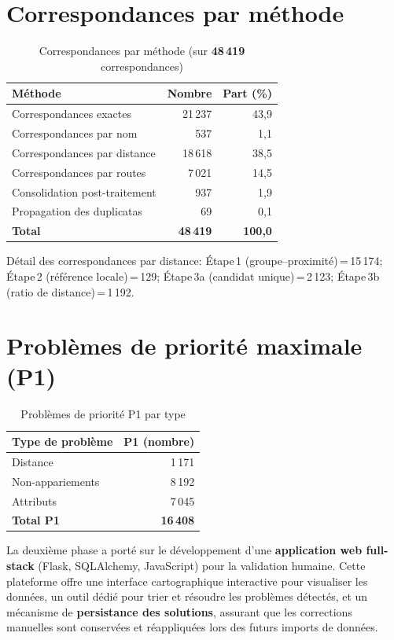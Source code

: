 \section*{Correspondances par méthode}
\begin{table}[h]
\centering
\caption{Correspondances par méthode (sur \textbf{48\,419} correspondances)}
\label{tab:matches_by_method_conclusion}
\begin{tabular}{|l|r|r|}
\hline
\textbf{Méthode} & \textbf{Nombre} & \textbf{Part (\%)} \\
\hline
Correspondances exactes & 21\,237 & 43,9 \\
Correspondances par nom & 537 & 1,1 \\
Correspondances par distance & 18\,618 & 38,5 \\
Correspondances par routes & 7\,021 & 14,5 \\
Consolidation post-traitement & 937 & 1,9 \\
Propagation des duplicatas & 69 & 0,1 \\
\hline
\textbf{Total} & \textbf{48\,419} & \textbf{100,0} \\
\hline
\end{tabular}
\end{table}

\noindent\small Détail des correspondances par distance: Étape\,1 (groupe–proximité)\,=\,15\,174; Étape\,2 (référence locale)\,=\,129; Étape\,3a (candidat unique)\,=\,2\,123; Étape\,3b (ratio de distance)\,=\,1\,192.

\vspace{0.5em}
\section*{Problèmes de priorité maximale (P1)}
\begin{table}[h]
\centering
\caption{Problèmes de priorité P1 par type}
\label{tab:p1_problems_conclusion}
\begin{tabular}{|l|r|}
\hline
\textbf{Type de problème} & \textbf{P1 (nombre)} \\
\hline
Distance & 1\,171 \\
Non-appariements & 8\,192 \\
Attributs & 7\,045 \\
\hline
\textbf{Total P1} & \textbf{16\,408} \\
\hline
\end{tabular}
\end{table}

La deuxième phase a porté sur le développement d'une \textbf{application web full-stack} (Flask, SQLAlchemy, JavaScript) pour la validation humaine. Cette plateforme offre une interface cartographique interactive pour visualiser les données, un outil dédié pour trier et résoudre les problèmes détectés, et un mécanisme de \textbf{persistance des solutions}, assurant que les corrections manuelles sont conservées et réappliquées lors des futurs imports de données.


